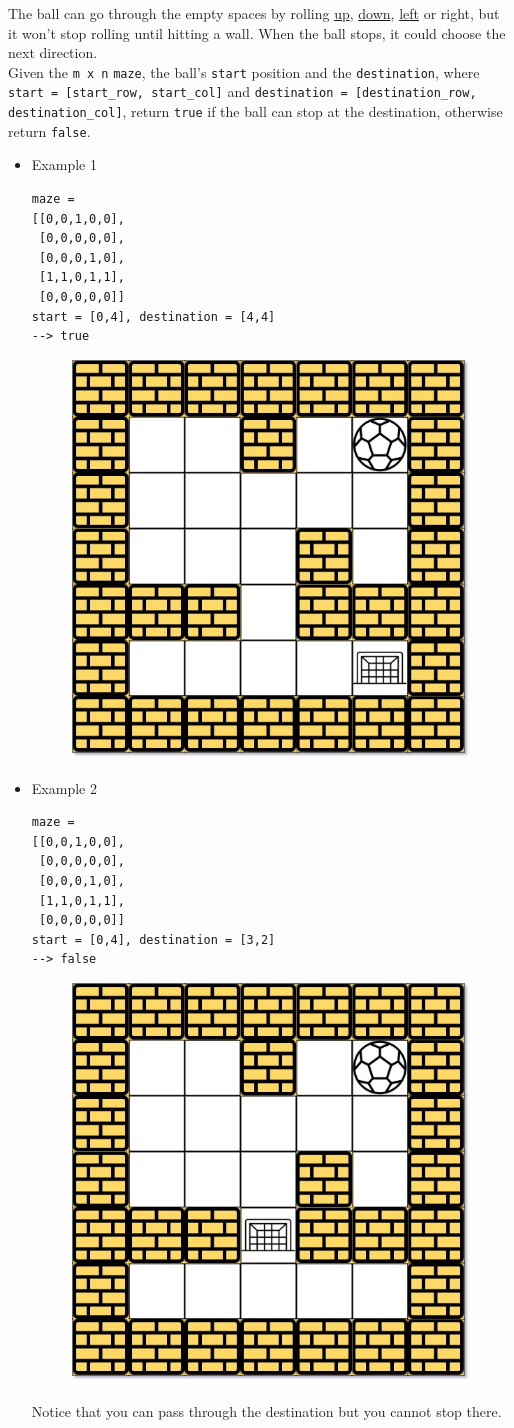 The ball can go through the empty spaces by rolling \ul{up}, \ul{down}, \ul{left} or right, but it won't stop rolling until hitting a wall. When the ball stops, it could choose the next direction.\\

Given the {\colorbox{CodeBackground}{\lstinline|m x n|}} {\colorbox{CodeBackground}{\lstinline|maze|}}, the ball's {\colorbox{CodeBackground}{\lstinline|start|}} position and the {\colorbox{CodeBackground}{\lstinline|destination|}}, where {\colorbox{CodeBackground}{\lstinline|start = [start_row, start_col]|}} and {\colorbox{CodeBackground}{\lstinline|destination = [destination_row, destination_col]|}}, return {\colorbox{CodeBackground}{\lstinline|true|}} if the ball can stop at the destination, otherwise return {\colorbox{CodeBackground}{\lstinline|false|}}.

\begin{itemize}
\item Example 1
\begin{lstlisting}
maze = 
[[0,0,1,0,0],
 [0,0,0,0,0],
 [0,0,0,1,0],
 [1,1,0,1,1],
 [0,0,0,0,0]]
start = [0,4], destination = [4,4]
--> true
\end{lstlisting}
\begin{figure}[H]
\centering
\includegraphics[width=0.25\linewidth]{images/lc0490_eg1}
\label{fig:lc0490eg1}
\end{figure}
\item Example 2
\begin{lstlisting}
maze = 
[[0,0,1,0,0],
 [0,0,0,0,0],
 [0,0,0,1,0],
 [1,1,0,1,1],
 [0,0,0,0,0]]
start = [0,4], destination = [3,2]
--> false
\end{lstlisting}
\begin{figure}[H]
\centering
\includegraphics[width=0.25\linewidth]{images/lc0490_eg2}
\label{fig:lc0490eg2}
\end{figure}
Notice that you can pass through the destination but you cannot stop there.
\end{itemize}

